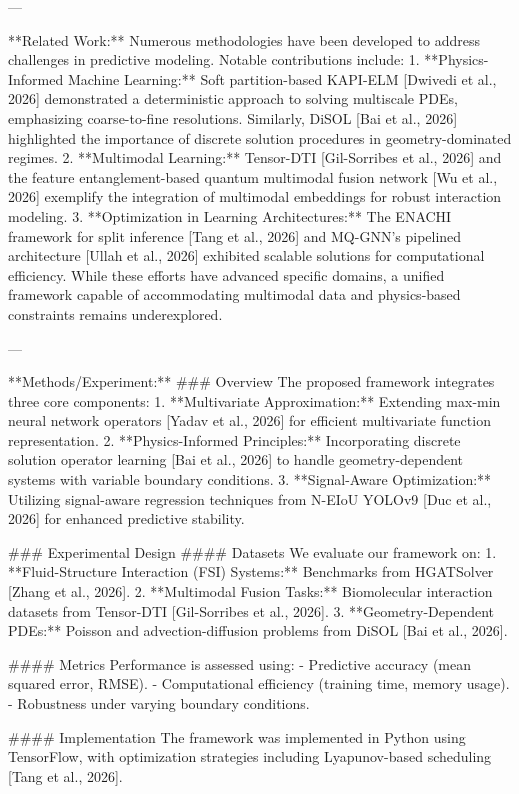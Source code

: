 ---

**Related Work:**  
Numerous methodologies have been developed to address challenges in predictive modeling. Notable contributions include:  
1. **Physics-Informed Machine Learning:** Soft partition-based KAPI-ELM [Dwivedi et al., 2026] demonstrated a deterministic approach to solving multiscale PDEs, emphasizing coarse-to-fine resolutions. Similarly, DiSOL [Bai et al., 2026] highlighted the importance of discrete solution procedures in geometry-dominated regimes.
2. **Multimodal Learning:** Tensor-DTI [Gil-Sorribes et al., 2026] and the feature entanglement-based quantum multimodal fusion network [Wu et al., 2026] exemplify the integration of multimodal embeddings for robust interaction modeling.
3. **Optimization in Learning Architectures:** The ENACHI framework for split inference [Tang et al., 2026] and MQ-GNN's pipelined architecture [Ullah et al., 2026] exhibited scalable solutions for computational efficiency.
While these efforts have advanced specific domains, a unified framework capable of accommodating multimodal data and physics-based constraints remains underexplored.

---

**Methods/Experiment:**  
### Overview  
The proposed framework integrates three core components:  
1. **Multivariate Approximation:** Extending max-min neural network operators [Yadav et al., 2026] for efficient multivariate function representation.  
2. **Physics-Informed Principles:** Incorporating discrete solution operator learning [Bai et al., 2026] to handle geometry-dependent systems with variable boundary conditions.  
3. **Signal-Aware Optimization:** Utilizing signal-aware regression techniques from N-EIoU YOLOv9 [Duc et al., 2026] for enhanced predictive stability.

### Experimental Design  
#### Datasets  
We evaluate our framework on:  
1. **Fluid-Structure Interaction (FSI) Systems:** Benchmarks from HGATSolver [Zhang et al., 2026].  
2. **Multimodal Fusion Tasks:** Biomolecular interaction datasets from Tensor-DTI [Gil-Sorribes et al., 2026].  
3. **Geometry-Dependent PDEs:** Poisson and advection-diffusion problems from DiSOL [Bai et al., 2026].

#### Metrics  
Performance is assessed using:  
- Predictive accuracy (mean squared error, RMSE).  
- Computational efficiency (training time, memory usage).  
- Robustness under varying boundary conditions.  

#### Implementation  
The framework was implemented in Python using TensorFlow, with optimization strategies including Lyapunov-based scheduling [Tang et al., 2026].

